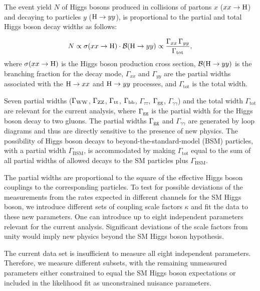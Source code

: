 \documentclass[11pt,twoside,a4paper,cmspaper,final,collab]{cms-tdr}
\begin{document}
The event yield $N$ of Higgs bosons produced in collisions of partons $x$ ($xx \to \mathrm{H}$)
and decaying to particles $y$ ($\mathrm{H} \to yy$), is proportional to the
partial and total Higgs boson decay widths as follows:

\begin{equation}
N \propto \sigma(xx \to \mathrm{H}) \cdot \mathcal{B}(\mathrm{H} \to yy)
  \propto \frac {\Gamma_{xx} \, \Gamma_{yy} }
                { \Gamma_{\mathrm{tot}} },
\end{equation}
where $\sigma(xx \to \mathrm{H})$ is the Higgs boson production cross section, $\mathcal{B}(\mathrm{H} \to yy)$
is the branching fraction for the decay mode, $\Gamma_{xx}$ and
$\Gamma_{yy}$ are the partial widths
associated with the $\mathrm{H} \to xx$ and $\mathrm{H} \to yy$ processes, and $\Gamma_{\mathrm{tot}}$ is the total width.

Seven partial widths
($\Gamma_{\mathrm{W}\mathrm{W}}$,
$\Gamma_{\mathrm{Z}\mathrm{Z}}$,
$\Gamma_{\mathrm{t}\mathrm{t}}$,
$\Gamma_{\mathrm{b}\mathrm{b}}$,
$\Gamma_{\tau\tau}$,
$\Gamma_{\mathrm{g}\mathrm{g}}$,
$\Gamma_{\gamma\gamma}$)
and the total width $\Gamma_{\text{tot}}$ are relevant for the current analysis,
where $\Gamma_{\mathrm{g}\mathrm{g}}$ is the partial width for the Higgs boson decay to two gluons.
The partial widths $\Gamma_{\mathrm{g}\mathrm{g}}$ and $\Gamma_{\gamma\gamma}$ are generated by loop diagrams and thus
are directly sensitive to the presence of new physics.
The possibility of Higgs boson decays to beyond-the-standard-model (BSM) particles,
with a partial width $\Gamma_{\mathrm{BSM}}$, is
accommodated by making $\Gamma_{\text{tot}}$ equal to
the sum of all partial widths of allowed decays to the SM particles plus $\Gamma_{\mathrm{BSM}}$.

The partial widths are proportional to the square of the effective Higgs boson
couplings to the corresponding particles.
To test for possible deviations of the measurements from the rates expected in different channels
for the SM Higgs boson, we introduce different sets of coupling scale factors $\kappa$
and fit the data to these new parameters. One can introduce up to eight independent parameters
relevant for the current analysis.
Significant deviations of the scale factors from unity
would imply new physics beyond the SM Higgs boson hypothesis.

The current data set is insufficient to measure all
eight independent parameters.
Therefore, we measure different subsets, with the remaining
unmeasured parameters either constrained to equal the SM Higgs boson expectations
or included in the likelihood fit as unconstrained nuisance parameters.
\end{document}
